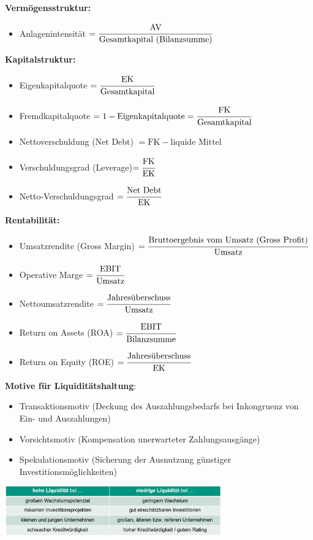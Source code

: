 \textbf{Vermögensstruktur:}
\begin{itemize}
	\item Anlagenintensität $=\cfrac{\text{AV}}{\text{Gesamtkapital (Bilanzsumme)}}$
\end{itemize}
	
\textbf{Kapitalstruktur:}
\begin{itemize}
	\item Eigenkapitalquote $=\cfrac{\text{EK}}{\text{Gesamtkapital}}$
	\item Fremdkapitalquote $=1 - \text{Eigenkapitalquote} =\cfrac{\text{FK}}{\text{Gesamtkapital}}$
	\item Nettoverschuldung (Net Debt) $=\text{FK} - \text{liquide Mittel}$
	\item Verschuldungsgrad (Leverage)$=\cfrac{\text{FK}}{\text{EK}}$
	\item Netto-Verschuldungsgrad $=\cfrac{\text{Net Debt}}{\text{EK}}$
\end{itemize}

\textbf{Rentabilität:}
\begin{itemize}
	\item Umsatzrendite (Gross Margin) $=\cfrac{\text{Bruttoergebnis vom Umsatz (Gross Profit)}}{\text{Umsatz}}$
	\item Operative Marge $=\cfrac{\text{EBIT}}{\text{Umsatz}}$
	\item Nettoumsatzrendite $=\cfrac{\text {Jahresüberschuss}}{\text{Umsatz}}$
	\item Return on Assets (ROA) $=\cfrac{\text{EBIT}}{\text{Bilanzsumme}}$
	\item Return on Equity (ROE) $=\cfrac{\text{Jahresüberschuss}}{\text{EK}}$
\end{itemize}
\bigskip
\textbf{Motive für Liquiditätshaltung}:
\begin{itemize}
	\item Transaktionsmotiv (Deckung des Auszahlungsbedarfs bei Inkongruenz von Ein- und Auszahlungen)
	\item Vorsichtsmotiv (Kompensation unerwarteter Zahlungsausgänge)
	\item Spekulationsmotiv (Sicherung der Ausnutzung günstiger Investitionsmöglichkeiten)
\end{itemize}
\begin{center}
	\includegraphics[width=0.7\textwidth]{images/e3.png}
\end{center}
\pagebreak

